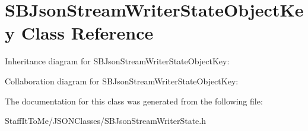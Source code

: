 \hypertarget{interface_s_b_json_stream_writer_state_object_key}{
\section{\-S\-B\-Json\-Stream\-Writer\-State\-Object\-Key \-Class \-Reference}
\label{interface_s_b_json_stream_writer_state_object_key}
}


\-Inheritance diagram for \-S\-B\-Json\-Stream\-Writer\-State\-Object\-Key\-:


\-Collaboration diagram for \-S\-B\-Json\-Stream\-Writer\-State\-Object\-Key\-:


\-The documentation for this class was generated from the following file\-:\begin{DoxyCompactItemize}
\item 
\-Staff\-It\-To\-Me/\-J\-S\-O\-N\-Classes/\-S\-B\-Json\-Stream\-Writer\-State.\-h\end{DoxyCompactItemize}

